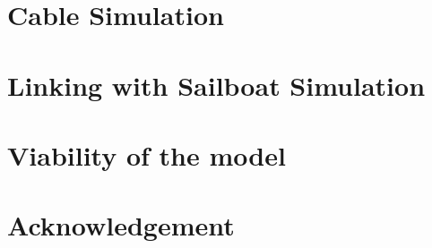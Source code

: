 \documentclass[11pt]{article} %
\begin{document}
\section{Cable Simulation}


\section{Linking with Sailboat Simulation}


\section{Viability of the model}

\section*{Acknowledgement}

%


\nocite{*}


\end{document}
